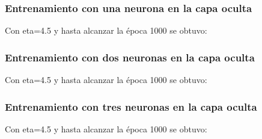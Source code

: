 \documentclass[11pt]{article}
\begin{document}
\subsubsection{Entrenamiento con una neurona en la capa oculta}
Con eta=4.5 y hasta alcanzar la \'epoca 1000 se obtuvo:
\subsubsection{Entrenamiento con dos neuronas en la capa oculta}
Con eta=4.5 y hasta alcanzar la \'epoca 1000 se obtuvo:
\subsubsection{Entrenamiento con tres neuronas en la capa oculta}
Con eta=4.5 y hasta alcanzar la \'epoca 1000 se obtuvo:
\end{document}
